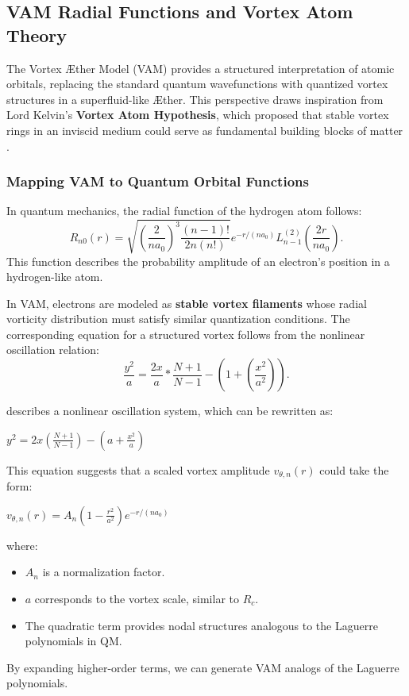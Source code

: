 

\subsection{VAM Radial Functions and Vortex Atom Theory}

The Vortex Æther Model (VAM) provides a structured interpretation of atomic orbitals, replacing the standard quantum wavefunctions with quantized vortex structures in a superfluid-like Æther. This perspective draws inspiration from Lord Kelvin's \textbf{Vortex Atom Hypothesis}, which proposed that stable vortex rings in an inviscid medium could serve as fundamental building blocks of matter \cite{kelvin1867_vortexAtoms}.

\subsubsection{Mapping VAM to Quantum Orbital Functions}

In quantum mechanics, the radial function of the hydrogen atom follows:
\begin{equation}
    R_{n0}(r) = \sqrt{\left(\frac{2}{n a_0}\right)^3 \frac{(n-1)!}{2n(n!)}} e^{-r / (n a_0)} L_{n-1}^{(2)}\left(\frac{2r}{n a_0}\right).
\end{equation}
This function describes the probability amplitude of an electron's position in a hydrogen-like atom.

In VAM, electrons are modeled as \textbf{stable vortex filaments} whose radial vorticity distribution must satisfy similar quantization conditions. The corresponding equation for a structured vortex follows from the nonlinear oscillation relation:
\begin{equation}
    \frac{y^2}{a} = \frac{2 x}{a} * \frac{N + 1}{N - 1} - \left(1 + \left(\frac{x^2}{a^2}\right)\right).
\end{equation}


describes a nonlinear oscillation system, which can be rewritten as:

$y^2 = 2x \left(\frac{N+1}{N-1}\right) - \left(a + \frac{x^2}{a}\right)$

This equation suggests that a scaled vortex amplitude $v_{\theta, n}(r)$ could take the form:

$v_{\theta, n}(r) = A_n \left(1 - \frac{r^2}{a^2}\right) e^{-r / (n a_0)}$

where:

\begin{itemize}
\item $A_n$ is a normalization factor.
\item $a$ corresponds to the vortex scale, similar to $R_c$.
\item The quadratic term provides nodal structures analogous to the Laguerre polynomials in QM.
\end{itemize}
By expanding higher-order terms, we can generate VAM analogs of the Laguerre polynomials.


